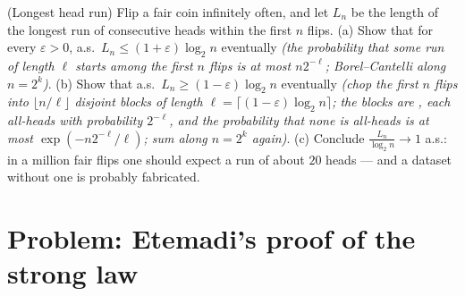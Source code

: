 \begin{exercise}[$\star\star$]\label{exo:b3:probability:12}
(Longest head run) Flip a fair coin infinitely often, and
let $L_n$ be the length of the longest run of consecutive
heads within the first $n$ flips.
(a) Show that for every $\varepsilon > 0$, a.s.\ $L_n \leq
(1 + \varepsilon)\log_2n$ eventually \emph{(the probability
that some run of length $\ell$ starts among the first $n$
flips is at most $n2^{-\ell}$; Borel--Cantelli along $n =
2^k$)}.
(b) Show that a.s.\ $L_n \geq (1 - \varepsilon)\log_2n$
eventually \emph{(chop the first $n$ flips into
$\lfloor n/\ell\rfloor$ disjoint blocks of length $\ell =
\lceil(1 - \varepsilon)\log_2n\rceil$; the blocks are
, each all-heads with probability $2^{-\ell}$,
and the probability that none is all-heads is at most
$\exp(-n2^{-\ell}/\ell)$; sum along $n = 2^k$ again)}.
(c) Conclude $\frac{L_n}{\log_2n} \to 1$ a.s.: in a million
fair flips one should expect a run of about $20$ heads ---
and a dataset without one is probably fabricated.
\end{exercise}

\section{Problem: Etemadi's proof of the strong law}

